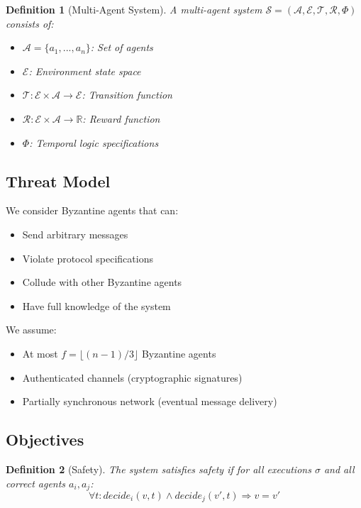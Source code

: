 \documentclass[conference]{IEEEtran}
\newtheorem{definition}{Definition}
\begin{document}
\begin{definition}[Multi-Agent System]
A multi-agent system $\mathcal{S} = (\mathcal{A}, \mathcal{E}, \mathcal{T}, \mathcal{R}, \Phi)$ consists of:
\begin{itemize}
    \item $\mathcal{A} = \{a_1, ..., a_n\}$: Set of agents
    \item $\mathcal{E}$: Environment state space
    \item $\mathcal{T}: \mathcal{E} \times \mathcal{A} \rightarrow \mathcal{E}$: Transition function
    \item $\mathcal{R}: \mathcal{E} \times \mathcal{A} \rightarrow \mathbb{R}$: Reward function
    \item $\Phi$: Temporal logic specifications
\end{itemize}
\end{definition}

\subsection{Threat Model}

We consider Byzantine agents that can:
\begin{itemize}
    \item Send arbitrary messages
    \item Violate protocol specifications
    \item Collude with other Byzantine agents
    \item Have full knowledge of the system
\end{itemize}

We assume:
\begin{itemize}
    \item At most $f = \lfloor(n-1)/3\rfloor$ Byzantine agents
    \item Authenticated channels (cryptographic signatures)
    \item Partially synchronous network (eventual message delivery)
\end{itemize}

\subsection{Objectives}

\begin{definition}[Safety]
The system satisfies safety if for all executions $\sigma$ and all correct agents $a_i, a_j$:
\begin{equation}
\forall t: decide_i(v, t) \land decide_j(v', t) \Rightarrow v = v'
\end{equation}
\end{definition}
\end{document}
